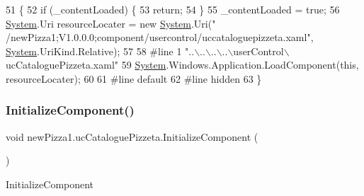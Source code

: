 \begin{DoxyCode}
51                                           \{
52             \textcolor{keywordflow}{if} (\_contentLoaded) \{
53                 \textcolor{keywordflow}{return};
54             \}
55             \_contentLoaded = \textcolor{keyword}{true};
56             \hyperlink{namespaceSystem}{System}.Uri resourceLocater = \textcolor{keyword}{new} \hyperlink{namespaceSystem}{System}.Uri(\textcolor{stringliteral}{"
      /newPizza1;V1.0.0.0;component/usercontrol/uccataloguepizzeta.xaml"}, \hyperlink{namespaceSystem}{System}.UriKind.Relative);
57             
58 \textcolor{preprocessor}{            #line 1 "..\(\backslash\)..\(\backslash\)..\(\backslash\)..\(\backslash\)userControl\(\backslash\)ucCataloguePizzeta.xaml"
}
59             \hyperlink{namespaceSystem}{System}.Windows.Application.LoadComponent(\textcolor{keyword}{this}, resourceLocater);
60             
61 \textcolor{preprocessor}{            #line default
}
62 \textcolor{preprocessor}{            #line hidden
}
63         \}
\end{DoxyCode}
\mbox{\label{classnewPizza1_1_1ucCataloguePizzeta_afdbc12c0fdebf3e506da6fe56e30af7b}} 
\subsubsection{\texorpdfstring{Initialize\+Component()}{InitializeComponent()}\hspace{0.1cm}{\footnotesize\ttfamily [2/6]}}
{\footnotesize\ttfamily void new\+Pizza1.\+uc\+Catalogue\+Pizzeta.\+Initialize\+Component (\begin{DoxyParamCaption}{ }\end{DoxyParamCaption})\hspace{0.3cm}{\ttfamily [inline]}}



Initialize\+Component 


